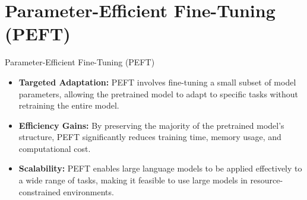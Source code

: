 \documentclass[serif, aspectratio=169]{beamer}
\begin{document}
\section{Parameter-Efficient Fine-Tuning (PEFT)}
\begin{frame}{Parameter-Efficient Fine-Tuning (PEFT)}
    \begin{itemize}
        \item  
            \textbf{Targeted Adaptation:}
             PEFT involves fine-tuning a small subset of model parameters, allowing the pretrained model to adapt to specific tasks without retraining the entire model.
            \vspace{0.3cm}
        \item  
            \textbf{Efficiency Gains:}
              By preserving the majority of the pretrained model’s structure, PEFT significantly reduces training time, memory usage, and computational cost.
            \vspace{0.3cm}
        \item  
            \textbf{Scalability:}
              PEFT enables large language models to be applied effectively to a wide range of tasks, making it feasible to use large models in resource-constrained environments.
            \vspace{0.3cm}
    \end{itemize}
\end{frame}
    
\end{document}
